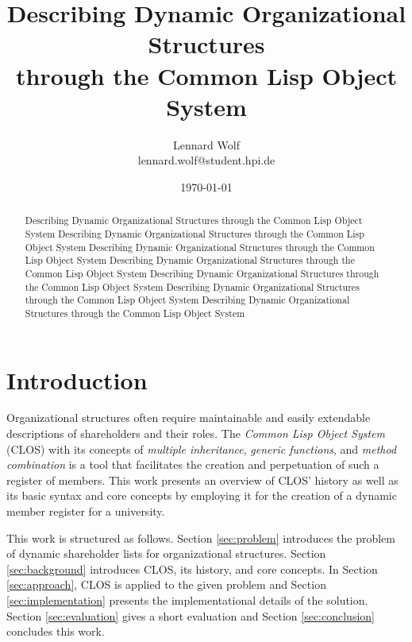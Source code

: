 \documentclass[oribibl]{llncs}
\author{Lennard Wolf \\
        lennard.wolf@student.hpi.de}
\institute{ Hasso Plattner Institute \\
            Prof.-Dr.-Helmert-Straße 2-3 \\
            14482 Potsdam \\
            Germany}
\title{Describing Dynamic Organizational Structures \\
 through the Common Lisp Object System}
\date{\today}
\begin{document}
\thispagestyle{empty}
\vfill

%
\maketitle
%
\begin{abstract}
Describing Dynamic Organizational Structures through the Common Lisp Object System Describing Dynamic Organizational Structures through the Common Lisp Object System Describing Dynamic Organizational Structures through the Common Lisp Object System Describing Dynamic Organizational Structures through the Common Lisp Object System Describing Dynamic Organizational Structures through the Common Lisp Object System Describing Dynamic Organizational Structures through the Common Lisp Object System Describing Dynamic Organizational Structures through the Common Lisp Object System
\end{abstract}
%


\section{Introduction}

Organizational structures often require maintainable and easily extendable descriptions of shareholders and their roles. The \emph{Common Lisp Object System} (CLOS) with its concepts of \emph{multiple inheritance}, \emph{generic functions}, and \emph{method combination} is a tool that facilitates the creation and perpetuation of such a register of members. This work presents an overview of CLOS' history as well as its basic syntax and core concepts by employing it for the creation of a dynamic member register for a university. 
\newline

This work is structured as follows. Section \ref{sec:problem} introduces the problem of dynamic shareholder lists for organizational structures. Section \ref{sec:background} introduces CLOS, its history, and core concepts. In Section \ref{sec:approach}, CLOS is applied to the given problem and Section \ref{sec:implementation} presents the implementational details of the solution. Section \ref{sec:evaluation} gives a short evaluation and Section \ref{sec:conclusion} concludes this work.
\end{document}

